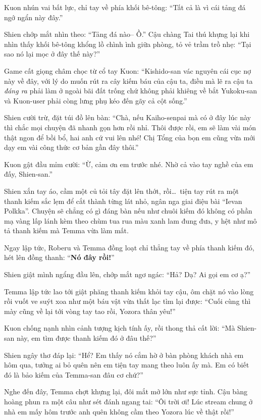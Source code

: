 \documentclass[../main.tex]{subfiles}
\begin{document}
Kuon nhún vai bất lực, chỉ tay về phía khối bê-tông: ``Tất cả là vì cái tảng đá ngớ ngẩn này đây.''

Shien chớp mắt nhìn theo: ``Tảng đá nào-- Ồ.'' Cậu chàng Tai thú khựng lại khi nhìn thấy khối bê-tông khổng lồ chình ình giữa phòng, tỏ vẻ trầm trồ nhẹ: ``Tại sao nó lại mọc ở đây thế này?''

Game cất giọng châm chọc từ cổ tay Kuon: ``Kishido-san vác nguyên cái cục nợ này về đây, với lý do muốn rút ra cây kiếm báu của cậu ta, điều mà lẽ ra cậu ta \emph{đáng ra} phải làm ở ngoài bãi đất trống chứ không phải khiêng về bắt Yukoku-san và Kuon-user phải còng lưng phụ kéo đến gãy cả cột sống.''

Shien cười trừ, đặt túi đồ lên bàn: ``Chà, nếu Kaiho-senpai mà có ở đây lúc này thì chắc mọi chuyện đã nhanh gọn hơn rồi nhỉ. Thôi được rồi, em sẽ làm vài món thật ngon để bồi bổ, hai anh cứ vui lên nhé! Chị Tổng của bọn em cũng vừa mới dạy em vài công thức cơ bản gần đây thôi.''

Kuon gật đầu mỉm cười: ``Ừ, cảm ơn em trước nhé. Nhờ cả vào tay nghề của em đấy, Shien-san.''

Shien xắn tay áo, cầm một củ tỏi tây đặt lên thớt, rồi\dots\ tiện tay rút ra một thanh kiếm sắc lẹm để cắt thành từng lát nhỏ, ngân nga giai điệu bài ``Ievan Polkka''. Chuyện sẽ chẳng có gì đáng bàn nếu như chuôi kiếm đó không có phần mạ vàng lấp lánh kèm theo chùm tua rua màu xanh lam đung đưa, y hệt như mô tả thanh kiếm mà Temma vừa làm mất.


Ngay lập tức, Roberu và Temma đồng loạt chỉ thẳng tay về phía thanh kiếm đó, hét lên đồng thanh: ``\textbf{Nó đây rồi!}''

Shien giật mình ngẩng đầu lên, chớp mắt ngơ ngác: ``Hả? Dạ? Ai gọi em cơ ạ?''

Temma lập tức lao tới giật phăng thanh kiếm khỏi tay cậu, ôm chặt nó vào lòng rồi vuốt ve suýt xoa như một báu vật vừa thất lạc tìm lại được: ``Cuối cùng thì mày cũng về lại tới vòng tay tao rồi, Yozora thân yêu!''

Kuon chống nạnh nhìn cảnh tượng kịch tính ấy, rồi thong thả cất lời: ``Mà Shien-san này, em tìm được thanh kiếm đó ở đâu thế?''

Shien ngây thơ đáp lại: ``Hể? Em thấy nó cắm hờ ở bàn phòng khách nhà em hôm qua, tưởng ai bỏ quên nên em tiện tay mang theo luôn ấy mà. Em có biết đó là bảo kiếm của Temma-san đâu cơ chứ?''

Nghe đến đây, Temma chợt khựng lại, đôi mắt mở lớn như sực tỉnh. Cậu bàng hoàng phun ra một câu như sét đánh ngang tai: ``Ôi trời ơi! Lúc stream chung ở nhà em mấy hôm trước anh quên không cầm theo Yozora lúc về thật rồi!''
\end{document}
